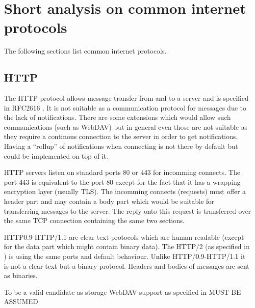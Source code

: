 \documentclass[a4paper,appendixprefix,pdfusetitle,twocolumn,fontsize=8pt,attachdocs,draft,status=draft]{scrbook}
\begin{document}
%



\twocolumn
\chapter{Short analysis on common internet protocols}
The following sections list common internet protocols.

\section{HTTP}
The HTTP protocol allows message transfer from and to a server and is specified in RFC2616 \cite{RFC2616}. It is not suitable as a communication protocol for messages due to the lack of notifications. There are some extensions which would allow such communications (such as WebDAV) but in general even those are not suitable as they require a continous connection to the server in order to get notifications. Having a ``rollup'' of notifications when connecting is not there by default but could be implemented on top of it. 

HTTP servers listen on standard ports 80 or 443 for incomming connects. The port 443 is equivalent to the port 80 except for the fact that it has a wrapping encryption layer (usually TLS). The incomming connects (requests) must offer a header part and may contain a body part which would be suitable for transferring messages to the server. The reply onto this request is transferred over the same TCP connection containing the same two sections.

HTTP0.9-HTTP/1.1 are clear text protocols which are human readable (except for the data part which might contain binary data). The HTTP/2 (as specified in \cite{RFC7540}) is using the same ports and default behaviour. Unlike HTTP/0.9-HTTP/1.1 it is not a clear text but a binary protocol. Headers and bodies of messages are sent as binaries. 

To be a valid candidate as storage WebDAV support as specified in \cite{rfc4918} MUST BE ASSUMED
\end{document}
